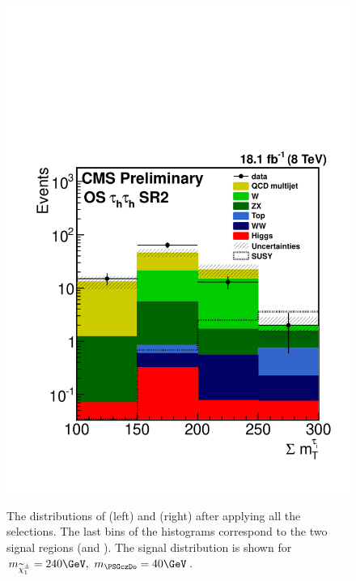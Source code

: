 \begin{figure}[!htb]
\includegraphics[angle=0,scale=0.375]{TauTauFigs/SumMT.pdf} \\ 
\caption{The distributions of \mttwo (left) and \SumMT (right) after applying all the selections. 
The last bins of the histograms correspond to the two signal regions (\binone and \bintwo). The signal distribution is shown for $m_{\chione}=240\GeV,~m_{\PSGczDo}=40\GeV$.}
\label{fig:comparison}
\end{figure}
